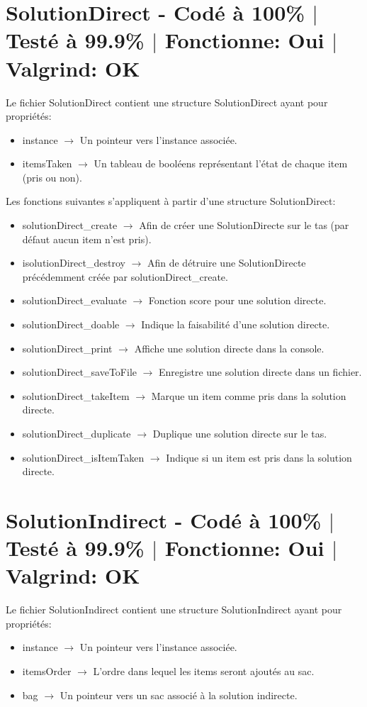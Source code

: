 \documentclass{EPUProjetPeiP}
\newcommand{\comp}[5]{
	\section[#1]{#1 {\small - Codé à #2\% $\vert$ Testé à #3\% $\vert$ Fonctionne: #4 $\vert$ Valgrind: #5}}
}
\begin{document}
\comp{SolutionDirect \label{sec:solutionDirect}}{100}{99.9}{Oui}{OK}
Le fichier SolutionDirect contient une structure SolutionDirect ayant pour propriétés:
\begin{itemize}
	\item instance $\longrightarrow$ Un pointeur vers l'instance associée.
	\item itemsTaken $\longrightarrow$ Un tableau de booléens représentant l'état de chaque item (pris ou non).\\
\end{itemize}

Les fonctions suivantes s'appliquent à partir d'une structure SolutionDirect:
\begin{itemize}
	\item solutionDirect\_create $\longrightarrow$ Afin de créer une SolutionDirecte sur le tas (par défaut aucun item n'est pris).
	\item isolutionDirect\_destroy $\longrightarrow$ Afin de détruire une SolutionDirecte précédemment créée par solutionDirect\_create.
	\item solutionDirect\_evaluate $\longrightarrow$ Fonction score pour une solution directe.
	\item solutionDirect\_doable $\longrightarrow$ Indique la faisabilité d'une solution directe.
	\item solutionDirect\_print $\longrightarrow$ Affiche une solution directe dans la console.
	\item solutionDirect\_saveToFile $\longrightarrow$ Enregistre une solution directe dans un fichier.
	\item solutionDirect\_takeItem $\longrightarrow$ Marque un item comme pris dans la solution directe.
	\item solutionDirect\_duplicate $\longrightarrow$ Duplique une solution directe sur le tas.
	\item solutionDirect\_isItemTaken $\longrightarrow$ Indique si un item est pris dans la solution directe.
\end{itemize}

\comp{SolutionIndirect}{100}{99.9}{Oui}{OK}
Le fichier SolutionIndirect contient une structure SolutionIndirect ayant pour propriétés:
\begin{itemize}
	\item instance $\longrightarrow$ Un pointeur vers l'instance associée.
	\item itemsOrder $\longrightarrow$ L'ordre dans lequel les items seront ajoutés au sac.
	\item bag $\longrightarrow$ Un pointeur vers un sac associé à la solution indirecte.\\
\end{itemize}
\end{document}
